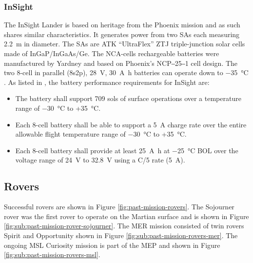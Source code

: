 \subsubsection{InSight}

The InSight Lander is based on heritage from the Phoenix mission and as such shares similar characteristics. It generates power from two \acp{SA} each measuring \SI{2.2}{\meter} in diameter. The \acp{SA} are  ATK ``UltraFlex'' ZTJ triple-junction solar cells made of \ac{InGaP}/\ac{InGaAs}/\ac{Ge}. The \ac{NCA}-cells rechargeable batteries were manufactured by Yardney and based on Phoenix's NCP‒25‒1 cell design. The two 8-cell in parallel (8s2p), \SI{28}{\volt}, \SI{30}{\ampere\hour} batteries can operate down to \SI{-35}{\celsius} . As listed in , the battery performance requirements for InSight are:

\begin{itemize}
  \item The battery shall support 709 sols of surface operations over a temperature range of \SI{-30}{\celsius} to +\SI{35}{\celsius}.
  \item Each 8-cell battery shall be able to support a \SI{5}{\ampere} charge rate over the entire allowable flight temperature range of \SI{-30}{\celsius} to +\SI{35}{\celsius}.
  \item Each 8-cell battery shall provide at least \SI{25}{\ampere\hour} at \SI{-25}{\celsius} \ac{BOL} over the voltage range of \SI{24}{\volt} to \SI{32.8}{\volt} using a C/5 rate (\SI{5}{\ampere}).
\end{itemize}

\clearpage
\subsection{Rovers}
\label{sec:StateOfTheArt:PastAndOngoingMissions:Rovers}

Successful rovers are shown in Figure \ref{fig:past-mission-rovers}. The Sojourner rover was the first rover to operate on the Martian surface and is shown in Figure \ref{fig:sub:past-mission-rover-sojourner}. The \ac{MER} mission consisted of twin rovers  Spirit and Opportunity shown in Figure \ref{fig:sub:past-mission-rovers-mer}. The ongoing \ac{MSL} Curiosity mission is part of the \ac{MEP} and shown in Figure \ref{fig:sub:past-mission-rovers-msl}.


